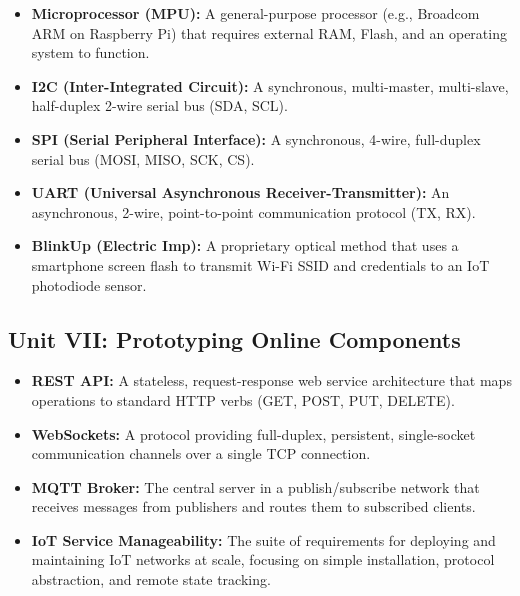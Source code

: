 \begin{itemize}
  \item   \textbf{Microprocessor (MPU):} A general-purpose processor (e.g., Broadcom ARM on Raspberry Pi) that requires external RAM, Flash, and an operating system to function.
  \item   \textbf{I2C (Inter-Integrated Circuit):} A synchronous, multi-master, multi-slave, half-duplex 2-wire serial bus (SDA, SCL).
  \item   \textbf{SPI (Serial Peripheral Interface):} A synchronous, 4-wire, full-duplex serial bus (MOSI, MISO, SCK, CS).
  \item   \textbf{UART (Universal Asynchronous Receiver-Transmitter):} An asynchronous, 2-wire, point-to-point communication protocol (TX, RX).
  \item   \textbf{BlinkUp (Electric Imp):} A proprietary optical method that uses a smartphone screen flash to transmit Wi-Fi SSID and credentials to an IoT photodiode sensor.
\end{itemize}

\subsection{Unit VII: Prototyping Online Components}
\begin{itemize}
  \item   \textbf{REST API:} A stateless, request-response web service architecture that maps operations to standard HTTP verbs (GET, POST, PUT, DELETE).
  \item   \textbf{WebSockets:} A protocol providing full-duplex, persistent, single-socket communication channels over a single TCP connection.
  \item   \textbf{MQTT Broker:} The central server in a publish/subscribe network that receives messages from publishers and routes them to subscribed clients.
  \item   \textbf{IoT Service Manageability:} The suite of requirements for deploying and maintaining IoT networks at scale, focusing on simple installation, protocol abstraction, and remote state tracking.
\end{itemize}


